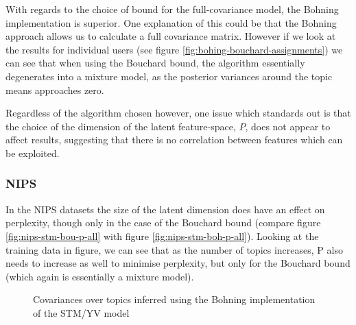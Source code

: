 With regards to the choice of bound for the full-covariance model, the Bohning implementation is superior. One explanation of this could be that the Bohning approach allows us to calculate a full covariance matrix. However if we look at the results for individual users (see figure \ref{fig:bohing-bouchard-assignments}) we can see that when using the Bouchard bound, the algorithm essentially degenerates into a mixture model, as the posterior variances around the topic means approaches zero. 


Regardless of the algorithm chosen however, one issue which standards out is that the choice of the dimension of the latent feature-space, $P$, does not appear to affect results, suggesting that there is no correlation between features which can be exploited.



\subsubsection*{NIPS}
In the NIPS datasets the size of the latent dimension does have an effect on perplexity, though only in the case of the Bouchard bound (compare figure \ref{fig:nips-stm-bou-p-all} with figure \ref{fig:nips-stm-boh-p-all}). Looking at the training data in figure, we can see that as the number of topics increases, P also needs to increase as well to minimise perplexity, but only for the Bouchard bound (which again is essentially a mixture model).


\begin{figure}
\centering     %
{}
\caption{Covariances over topics inferred using the Bohning implementation of the STM/YV model}
\end{figure}

